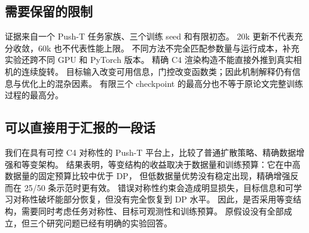 \subsection{需要保留的限制}
证据来自一个 Push-T 任务家族、三个训练 seed 和有限初态。
20k 更新不代表充分收敛，60k 也不代表性能上限。
不同方法不完全匹配参数量与运行成本，补充实验还跨不同 GPU 和 PyTorch 版本。
精确 C4 渲染构造不能直接外推到真实相机的连续旋转。
目标输入改变可用信息，门控改变函数类；因此机制解释仍有信息与优化上的混杂因素。
有限三个 checkpoint 的最高分也不等于原论文完整训练过程的最高分。

\subsection{可以直接用于汇报的一段话}
我们在具有可控 C4 对称性的 Push-T 平台上，比较了普通扩散策略、精确数据增强和等变架构。
结果表明，等变结构的收益取决于数据量和训练预算：它在中高数据量的固定预算比较中优于 DP，
但低数据量优势没有稳定出现，精确增强反而在 25/50 条示范时更有效。
错误对称性约束会造成明显损失，目标信息和可学习对称性破坏能部分恢复，但没有完全恢复到 DP 水平。
因此，是否采用等变结构，需要同时考虑任务对称性、目标可观测性和训练预算。
原假设没有全部成立，但三个研究问题已经有明确的实验回答。
